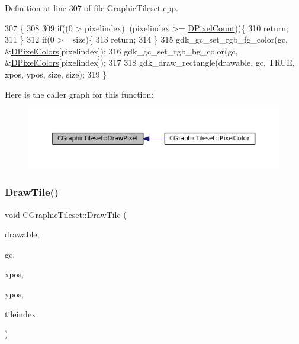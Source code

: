 Definition at line 307 of file Graphic\+Tileset.\+cpp.


\begin{DoxyCode}
307                                                                                                            
          \{
308 
309     \textcolor{keywordflow}{if}((0 > pixelindex)||(pixelindex >= \hyperlink{classCGraphicTileset_a55fc9ceb1c92383c124e61c911fe57db}{DPixelCount}))\{
310         \textcolor{keywordflow}{return};
311     \}
312     \textcolor{keywordflow}{if}(0 >= size)\{
313         \textcolor{keywordflow}{return};
314     \}
315     gdk\_gc\_set\_rgb\_fg\_color(gc, &\hyperlink{classCGraphicTileset_a4e9672b8b133dbac600fb8bb400d1cb3}{DPixelColors}[pixelindex]);
316     gdk\_gc\_set\_rgb\_bg\_color(gc, &\hyperlink{classCGraphicTileset_a4e9672b8b133dbac600fb8bb400d1cb3}{DPixelColors}[pixelindex]);
317     
318     gdk\_draw\_rectangle(drawable, gc, TRUE, xpos, ypos, size, size);
319 \}
\end{DoxyCode}
Here is the caller graph for this function\+:
\nopagebreak
\begin{figure}[H]
\begin{center}
\leavevmode
\includegraphics[width=350pt]{classCGraphicTileset_a8acad7ebeb4fad53a72681851f323812_icgraph}
\end{center}
\end{figure}
\hypertarget{classCGraphicTileset_afefd501a74e95295b7cd2dc868dcbbcb}{}\label{classCGraphicTileset_afefd501a74e95295b7cd2dc868dcbbcb} 
\subsubsection{\texorpdfstring{Draw\+Tile()}{DrawTile()}}
{\footnotesize\ttfamily void C\+Graphic\+Tileset\+::\+Draw\+Tile (\begin{DoxyParamCaption}\item[{Gdk\+Drawable $\ast$}]{drawable,  }\item[{Gdk\+GC $\ast$}]{gc,  }\item[{gint}]{xpos,  }\item[{gint}]{ypos,  }\item[{int}]{tileindex }\end{DoxyParamCaption})}



